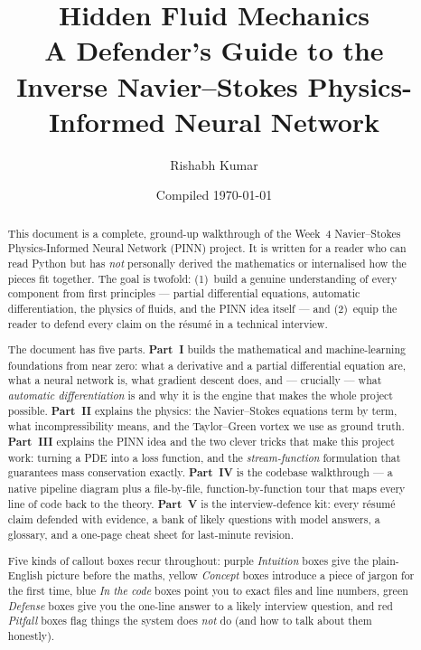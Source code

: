 \documentclass[11pt,a4paper]{article}
\title{\textbf{Hidden Fluid Mechanics}\\[0.5em]
       \large A Defender's Guide to the\\
       Inverse Navier--Stokes Physics-Informed Neural Network}
\author{Rishabh Kumar}
\date{Compiled \today}
\begin{document}
\maketitle

\begin{abstract}
\noindent This document is a complete, ground-up walkthrough of the Week~4
Navier--Stokes Physics-Informed Neural Network (PINN) project. It is written
for a reader who can read Python but has \emph{not} personally derived the
mathematics or internalised how the pieces fit together. The goal is twofold:
(1)~build a genuine understanding of every component from first principles ---
partial differential equations, automatic differentiation, the physics of
fluids, and the PINN idea itself --- and (2)~equip the reader to defend every
claim on the r\'esum\'e in a technical interview.

The document has five parts. \textbf{Part~I} builds the mathematical and
machine-learning foundations from near zero: what a derivative and a partial
differential equation are, what a neural network is, what gradient descent
does, and --- crucially --- what \emph{automatic differentiation} is and why
it is the engine that makes the whole project possible. \textbf{Part~II}
explains the physics: the Navier--Stokes equations term by term, what
incompressibility means, and the Taylor--Green vortex we use as ground truth.
\textbf{Part~III} explains the PINN idea and the two clever tricks that make
this project work: turning a PDE into a loss function, and the
\emph{stream-function} formulation that guarantees mass conservation exactly.
\textbf{Part~IV} is the codebase walkthrough --- a native pipeline diagram
plus a file-by-file, function-by-function tour that maps every line of code
back to the theory. \textbf{Part~V} is the interview-defence kit: every
r\'esum\'e claim defended with evidence, a bank of likely questions with model
answers, a glossary, and a one-page cheat sheet for last-minute revision.

Five kinds of callout boxes recur throughout: purple \textit{Intuition} boxes
give the plain-English picture before the maths, yellow \textit{Concept} boxes
introduce a piece of jargon for the first time, blue \textit{In the code} boxes
point you to exact files and line numbers, green \textit{Defense} boxes give
you the one-line answer to a likely interview question, and red
\textit{Pitfall} boxes flag things the system does \emph{not} do (and how to
talk about them honestly).
\end{abstract}
\end{document}
